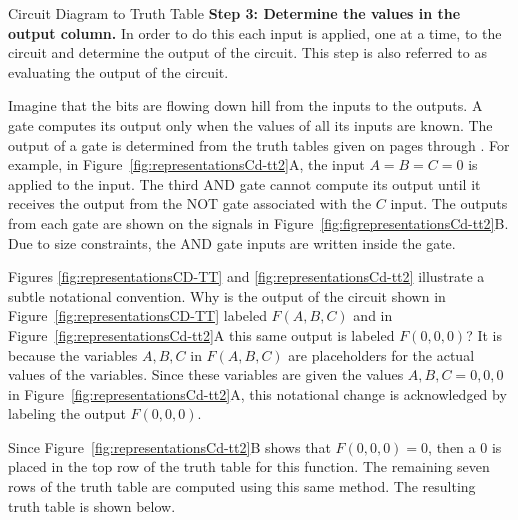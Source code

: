 \begin{process}{Circuit Diagram to Truth Table}
\textbf{Step 3: Determine the values in the output column. }
In order to do this each input is applied, one at a time, to 
the circuit and determine the output of the circuit.  This step is also
referred to as evaluating the output of the circuit.  

Imagine that 
the bits are flowing down hill from the inputs to the outputs.  A 
gate computes its output only when the values of all its inputs
are known.  The output of a gate is determined from the truth tables
given on pages \pageref{page:elf1} through \pageref{page:elf2}.  For example,
in Figure~\ref{fig:representationsCd-tt2}A, the input $A=B=C=0$ is applied
to the input.  The third AND gate cannot compute its output until
it receives the output from the NOT gate associated with the $C$ 
input.  The outputs from each gate are shown on the signals in
Figure~\ref{fig:figrepresentationsCd-tt2}B.  Due to size constraints, the AND gate 
inputs are written inside the gate.  


{\setlength{\fboxsep}{0pt}
\centering  
{}
\par}\vspace{0.2cm}


Figures \ref{fig:representationsCD-TT} and \ref{fig:representationsCd-tt2} 
illustrate a subtle notational convention. 
Why is the output of the circuit shown in Figure~\ref{fig:representationsCD-TT} 
labeled $F(A,B,C)$ and in Figure~\ref{fig:representationsCd-tt2}A this same output is
labeled  $F(0,0,0)$?  It is because the variables $A,B,C$ in $F(A,B,C)$ 
are placeholders for the actual values of the variables.  Since these
variables are given the values $A,B,C = 0,0,0$ in Figure~\ref{fig:representationsCd-tt2}A, 
this notational change is acknowledged by labeling the output $F(0,0,0)$.

Since Figure~\ref{fig:representationsCd-tt2}B shows that $F(0,0,0) = 0$, then
a 0 is placed in the top row of the truth table for this 
function.  The remaining seven rows of the truth table are computed 
using this same method.  The resulting truth table is shown below.


\end{process}
